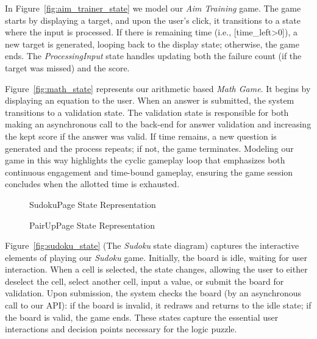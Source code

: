 \documentclass[11pt,a4paper]{article}
\newcommand{\inputdiagram}[1]{}
\newcommand{\textwidthdiagram}[2][1]{%
  \resizebox{#1\textwidth}{!}{\inputdiagram{#2}}%
}
\begin{document}
In Figure~\ref{fig:aim_trainer_state} we model our \textit{Aim Training} game. The
game starts by displaying a target, and upon the user's click, it transitions
to a state where the input is processed. If there is remaining time (i.e.,
[time\_left>0]), a new target is generated, looping back to the display state;
otherwise, the game ends. The \textit{ProcessingInput} state handles updating both
the failure count (if the target was missed) and the score.

Figure~\ref{fig:math_state} represents our arithmetic based \textit{Math Game}. It
begins by displaying an equation to the user. When an answer is submitted, the
system transitions to a validation state. The validation state is responsible
for both making an asynchronous call to the back-end for answer validation
and increasing the kept score if the answer was valid. If time remains,
a new question is generated and the process repeats; if not, the game
terminates. Modeling our game in this way highlights the cyclic gameplay
loop that emphasizes both continuous engagement and time-bound gameplay,
ensuring the game session concludes when the allotted time is exhausted.

\begin{figure}[H]
    \centering
    \begin{minipage}[b]{0.48\textwidth}
        \centering
        \textwidthdiagram{sudoku_state.tex}
        \caption{SudokuPage State Representation}
        \label{fig:sudoku_state}
    \end{minipage}
    \hfil
    \begin{minipage}[b]{0.48\textwidth}
        \centering
        \textwidthdiagram{pair_up_state.tex}
        \caption{PairUpPage State Representation}
        \label{fig:pair_up_state}
    \end{minipage}
\end{figure}

Figure~\ref{fig:sudoku_state} (The \textit{Sudoku} state diagram) captures
the interactive elements of playing our \textit{Sudoku} game. Initially, the board
is idle, waiting for user interaction. When a cell is selected, the state
changes, allowing the user to either deselect the cell, select another
cell, input a value, or submit the board for validation. Upon submission,
the system checks the board (by an asynchronous call to our API): if the
board is invalid, it redraws and returns to the idle state; if the board
is valid, the game ends. These states capture the essential user interactions
and decision points necessary for the logic puzzle.
\end{document}
